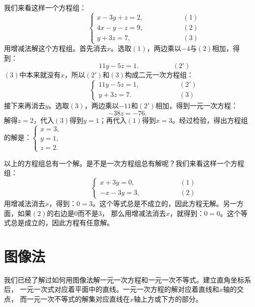 \documentclass[12pt,UTF8]{ctexbook}
\begin{document}
我们来看这样一个方程组：
$$ \quad \quad \quad \quad \quad\left\{
\begin{array}{cr}
     x - 3y + z = 2, & \quad \quad \quad \quad \quad (1) \\
     4x - y - z = 9, & \quad \quad \quad \quad \quad (2) \\
     y + 3z = 7, & \quad \quad \quad \quad \quad (3)
\end{array}\right.
$$
用增减法解这个方程组。首先消去$x$。选取$(1)$，两边乘以$-4$与$(2)$相加，得到：
$$ \quad\quad\quad\quad\quad 11y -5z = 1.\quad\quad\quad\quad\quad (2')$$
$(3)$中本来就没有$x$，所以$(2')$和$(3)$构成二元一次方程组：
$$ \quad \quad \quad \quad \quad\left\{
\begin{array}{cr}
    11y -5z = 1, & \quad \quad \quad \quad \quad (2') \\
    y + 3z = 7. & \quad \quad \quad \quad \quad (3) 
\end{array}\right.
$$
接下来再消去$y$。选取$(3)$，两边乘以$-11$和$(2')$相加，得到一元一次方程：
$$ -38z = -76.$$
解得$z = 2$，代入$(3)$得到$y = 1$；再代入$(1)$得到$x = 3$。经过检验，得出方程组的解是：$\left\{ \begin{array}{c}
    x = 3, \\
    y = 1, \\
    z = 2.
\end{array}\right.$

以上的方程组总有一个解。是不是一次方程组总有解呢？我们来看这样一个方程组：
$$ \quad \quad \quad \quad \quad\left\{
\begin{array}{cr}
     x + 3y = 0, & \quad \quad \quad \quad \quad (1) \\
     -x - 3y = 3, & \quad \quad \quad \quad \quad (2)
\end{array}\right.
$$
用增减法消去$x$，得到：$0 = 3$。这个等式总是不成立的，因此方程无解。另一方面，如果$(2)$的右边是$0$而不是$3$，
那么用增减法消去$x$，就得到：$0 = 0$。这个等式总是成立的，因此方程有任意解。

\section{图像法}
我们已经了解过如何用图像法解一元一次方程和一元一次不等式。建立直角坐标系后，
一元一次式对应着平面中的直线。一元一次方程的解对应着直线和$x$轴的交点，
而一元一次不等式的解集对应直线在$x$轴上方或下方的部分。
\end{document}
